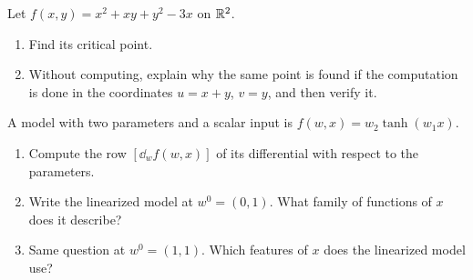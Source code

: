 \begin{notechapter}
\begin{exercise}\label{differential:exr:8}
Let $f(x, y) = x^2 + xy + y^2 - 3x$ on $\mathbb{R}^2$.
\begin{enumerate}[nosep]
  \item Find its critical point.
  \item Without computing, explain why the same point is found if the
        computation is done in the coordinates $u = x + y$, $v = y$, and
        then verify it.
\end{enumerate}
\end{exercise}

\begin{exercise}\label{differential:exr:9}
A model with two parameters and a scalar input is
$f(w, x) = w_2\tanh(w_1x)$.
\begin{enumerate}[nosep]
  \item Compute the row $[\dd_wf(w, x)]$ of its differential with respect
        to the parameters.
  \item Write the linearized model at $w^0 = (0, 1)$. What family of
        functions of $x$ does it describe?
  \item Same question at $w^0 = (1, 1)$. Which features of $x$ does the
        linearized model use?
\end{enumerate}
\end{exercise}
\end{notechapter}
